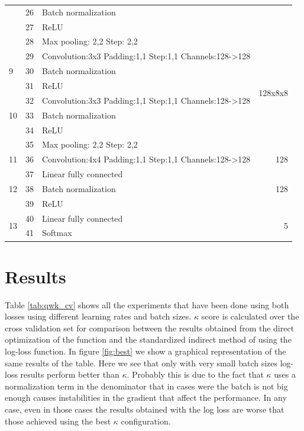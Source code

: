 \documentclass{IOS-Book-Article}
\begin{document}
\begin{table}[h!]
\begin{tabular}{l|c|l|r}
		& 26 & Batch normalization &\\
		& 27 & ReLU & \\
		& 28 & Max pooling: 2,2 Step: 2,2\\
		\hline		
		\multirow{3}{*}{9} & 29 & Convolution:3x3 Padding:1,1 Step:1,1 Channels:128->128 & \multirow{6}{*}{128x8x8}\\
		& 30 & Batch normalization &\\
		& 31 & ReLU & \\\cline{1-3}
		\multirow{3}{*}{10} & 32 & Convolution:3x3 Padding:1,1 Step:1,1 Channels:128->128 &\\
		& 33 & Batch normalization &\\
		& 34 & ReLU & \\
		& 35 & Max pooling: 2,2 Step: 2,2\\
		\hline
	    11 & 36 & Convolution:4x4 Padding:1,1 Step:1,1 Channels:128->128 & 128\\
		\hline
		\multirow{3}{*}{12} & 37 & Linear fully connected & \multirow{3}{*}{128}\\					
		& 38 & Batch normalization &\\
		& 39 & ReLU & \\
		\hline
		\multirow{2}{*}{13} & 40 & Linear fully connected & \multirow{2}{*}{5}\\
		& 41 & Softmax &\\
		\hline
	\end{tabular}
\end{table}


\section{Results}

Table \ref{tab:qwk_cv} shows all the experiments that have been done using both losses using different learning rates and batch sizes. $\kappa$ score is calculated over the cross validation set for comparison between the results obtained from the direct optimization of the function and the standardized indirect method of using the log-loss function. In figure \ref{fig:best} we show a graphical representation of the same results of the table. Here we see that only with very small batch sizes log-loss results perform better than $\kappa$. Probably this is due to the fact that $\kappa$ uses a normalization term in the denominator that in cases were the batch is not big enough causes instabilities in the gradient that affect the performance. In any case, even in those cases the results obtained with the log loss are worse that those achieved using the best $\kappa$ configuration.
\end{document}
